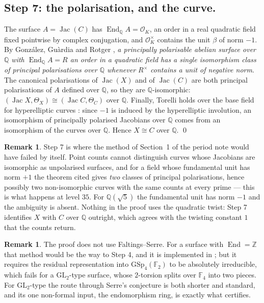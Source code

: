 \documentclass[11pt,reqno]{amsart}
\theoremstyle{plain}
\theoremstyle{definition}
\newtheorem{remark}[theorem]{Remark}
\DeclareMathOperator{\Jac}{Jac}
\DeclareMathOperator{\End}{End}
\newcommand{\Q}{\mathbb{Q}}
\newcommand{\Z}{\mathbb{Z}}
\newcommand{\F}{\mathbb{F}}
\newcommand{\OK}{\mathcal{O}_K}
\begin{document}
\subsection*{Step 7: the polarisation, and the curve.}
The surface $A=\Jac(C)$ has $\End_\Q A=\OK$, an order in a real quadratic field fixed pointwise by
complex conjugation, and $\OK^\times$ contains the unit $\beta$ of norm $-1$. By Gonz\'alez,
Gu\`ardia and Rotger \cite[Theorem~1.1(1)]{ggr}, \emph{a principally polarisable abelian surface
over $\Q$ with $\End_\Q A=R$ an order in a quadratic field has a single isomorphism class of
principal polarisations over $\Q$ whenever $R^\times$ contains a unit of negative norm}. The
canonical polarisations of $\Jac(X)$ and of $\Jac(C)$ are both principal polarisations of $A$
defined over $\Q$, so they are $\Q$-isomorphic: $(\Jac X,\Theta_X)\cong(\Jac C,\Theta_C)$ over
$\Q$. Finally, Torelli holds over the base field for hyperelliptic curves \cite{serre-lauter}:
since $-1$ is induced by the hyperelliptic involution, an isomorphism of principally polarised
Jacobians over $\Q$ comes from an isomorphism of the curves over $\Q$. Hence $X\cong C$ over $\Q$.
\qed

\begin{remark}
Step 7 is where the method of Section~1 of the period note would have failed by itself. Point
counts cannot distinguish curves whose Jacobians are isomorphic as unpolarised surfaces, and for a
field whose fundamental unit has norm $+1$ the theorem cited gives \emph{two} classes of principal
polarisations, hence possibly two non-isomorphic curves with the same counts at every prime ---
this is what happens at level $35$. For $\Q(\sqrt5)$ the fundamental unit has norm $-1$ and the
ambiguity is absent. Nothing in the proof uses the quadratic twist: Step 7 identifies $X$ with $C$
over $\Q$ outright, which agrees with the twisting constant $1$ that the counts return.
\end{remark}

\begin{remark}
The proof does not use Faltings--Serre. For a surface with $\End=\Z$ that method would be the way
to Step 4, and it is implemented in \cite{bppt}; but it requires the residual representation into
$\mathrm{GSp}_4(\F_2)$ to be absolutely irreducible, which fails for a $\mathrm{GL}_2$-type surface,
whose $2$-torsion splits over $\F_4$ into two pieces. For $\mathrm{GL}_2$-type the route through
Serre's conjecture is both shorter and standard, and its one non-formal input, the endomorphism
ring, is exactly what \cite{cmsv} certifies.
\end{remark}
\end{document}
